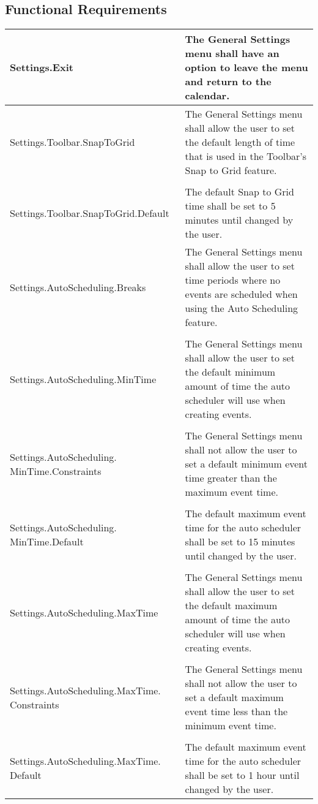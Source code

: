 \documentclass{scrreprt}
\begin{document}
\subsection{Functional Requirements}
\begin{center}
\begin{longtable}{ | p{6cm} | p{9cm} | }
\hline
Settings.Exit & The General Settings menu shall have an option to leave the menu and return to the calendar. \\
\hline
Settings.Toolbar.SnapToGrid & The General Settings menu shall allow the user to set the default length of time that is used in the Toolbar's Snap to Grid feature. \\
& \\
Settings.Toolbar.SnapToGrid.Default & The default Snap to Grid time shall be set to 5 minutes until changed by the user. \\
\hline
Settings.AutoScheduling.Breaks & The General Settings menu shall allow the user to set time periods where no events are scheduled when using the Auto Scheduling feature. \\
& \\
Settings.AutoScheduling.MinTime & The General Settings menu shall allow the user to set the default minimum amount of time the auto scheduler will use when creating events. \\
& \\
Settings.AutoScheduling. MinTime.Constraints & The General Settings menu shall not allow the user to set a default minimum event time greater than the maximum event time. \\
& \\
Settings.AutoScheduling. MinTime.Default & The default maximum event time for the auto scheduler shall be set to 15 minutes until changed by the user. \\
& \\
Settings.AutoScheduling.MaxTime & The General Settings menu shall allow the user to set the default maximum amount of time the auto scheduler will use when creating events. \\
& \\
Settings.AutoScheduling.MaxTime. Constraints & The General Settings menu shall not allow the user to set a default maximum event time less than the minimum event time. \\
& \\
Settings.AutoScheduling.MaxTime. Default & The default maximum event time for the auto scheduler shall be set to 1 hour until changed by the user. \\

\end{longtable}
\end{center}
\end{document}
